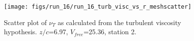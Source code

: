 \begin{figure}[H]
\centering
\texttt{[image: figs/run\_16/run\_16\_turb\_visc\_vs\_r\_meshscatter]}
\caption{Scatter plot of $\nu_T$ as calculated from the turbulent viscosity hypothesis. $z/c$=6.97, $V_{free}$=25.36, station 2.}
\label{fig:run_16_turb_visc_vs_r_meshscatter}
\end{figure}


